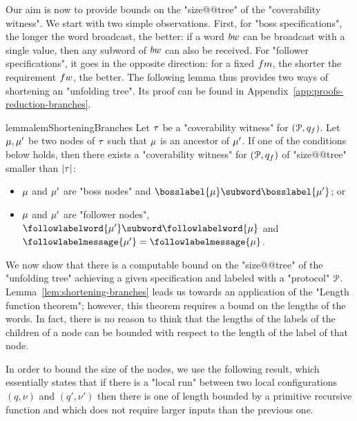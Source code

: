 Our aim is now to provide bounds on the "size@@tree" of the "coverability witness". We start with two simple observations. First, for "boss specifications", the longer the word broadcast, the better: if a word $\bossspec$ can be broadcast with a single value, then any subword of $\bossspec$ can also be received. 
For "follower specifications", it goes in the opposite direction: for a fixed $\followmessagespec$, the shorter the requirement $\followwordspec$, the better. The following lemma thus provides two ways of shortening an "unfolding tree". Its proof can be found in Appendix~\ref{app:proofs-reduction-branches}.

\begin{restatable}{lemma}{lemShorteningBranches} 
\label{lem:shortening-branches}
	Let $\tau$ be a "coverability witness" for $(\mathcal{P}, q_f)$.
	Let $\mu, \mu'$ be two nodes of $\tau$ such that $\mu$ is an ancestor of $\mu'$. If one of the conditions below holds, then there exists a "coverability witness" for $(\mathcal{P}, q_f)$ of "size@@tree" smaller than $|\tau|$:
	\begin{itemize}
	\item $\mu$ and $\mu'$ are "boss nodes" and $\bosslabel{\node} \subword \bosslabel{\node'}$; or
	\item $\mu$ and $\mu'$ are "follower nodes", $\followlabelword{\node'} \subword \followlabelword{\node}$ and $\followlabelmessage{\node'}=\followlabelmessage{\node}$.
	\end{itemize} 
\end{restatable}


We now show that there is a computable bound on the "size@@tree" of the "unfolding tree" achieving a given specification and labeled with a "protocol" $\mathcal{P}$. Lemma~\ref{lem:shortening-branches} leads us towards an application of the "Length function theorem"; however, this theorem requires a bound on the lengths of the words. In fact, there is no reason to think that the lengths of the labels of the children of a node can be bounded with respect to the length of the label of that node. 

In order to bound the size of the nodes, we use the following result, which essentially states that if there is a "local run" between two local configurations $(q, \nu)$ and $(q', \nu')$ then there is one of length bounded by a primitive recursive function and which does not require larger inputs than the previous one.

